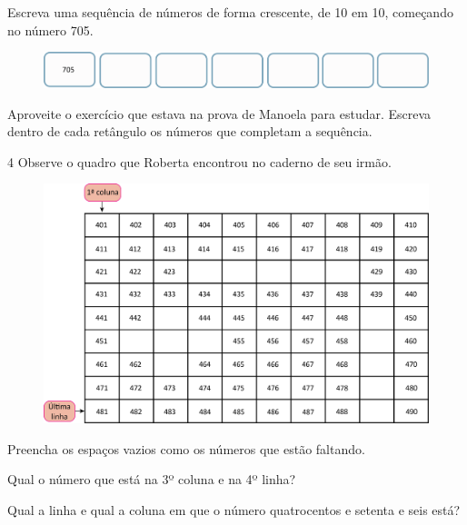 Escreva uma sequência de números de forma crescente, de 10 em 10, começando no número 705.

\begin{figure}[htpb!]
\includegraphics[width=\textwidth]{./media/image29.png}
\end{figure}

Aproveite o exercício que estava na prova de Manoela para estudar.
Escreva dentro de cada retângulo os números que completam a sequência.

\num{4} Observe o quadro que Roberta encontrou no caderno de seu irmão.

\begin{figure}[htpb!]
\includegraphics[width=\textwidth]{./media/image30.png}
\end{figure}

\begin{escolha}
\item Preencha os espaços vazios como os números que estão faltando.



\item Qual o número que está na 3º coluna e na 4º linha?

\item Qual a linha e qual a coluna em que o número quatrocentos e setenta e seis está?
\end{escolha}

